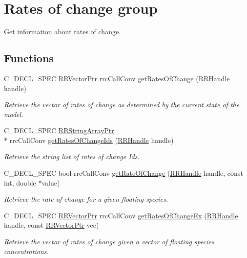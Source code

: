 \hypertarget{group__rate_of_change}{\section{Rates of change group}
\label{group__rate_of_change}
}


Get information about rates of change.  


\subsection*{Functions}
\begin{DoxyCompactItemize}
\item 
C\-\_\-\-D\-E\-C\-L\-\_\-\-S\-P\-E\-C \hyperlink{rrc__types_8h_a3be72d6006034fd349f753d2bf441bf7}{R\-R\-Vector\-Ptr} rrc\-Call\-Conv \hyperlink{group__rate_of_change_gad6f6fb8bf6b5e05b6337ec3c802709b3}{get\-Rates\-Of\-Change} (\hyperlink{rrc__types_8h_a1d68f0592372208fa5a5f2799ea4b3ae}{R\-R\-Handle} handle)
\begin{DoxyCompactList}\small\item\em Retrieve the vector of rates of change as determined by the current state of the model. \end{DoxyCompactList}\item 
C\-\_\-\-D\-E\-C\-L\-\_\-\-S\-P\-E\-C \hyperlink{rrc__types_8h_a7c9475df6c7337d99482b13a365e7596}{R\-R\-String\-Array\-Ptr} \\*
rrc\-Call\-Conv \hyperlink{group__rate_of_change_gaba7873ab3d30fc5b84bc3a901dcca811}{get\-Rates\-Of\-Change\-Ids} (\hyperlink{rrc__types_8h_a1d68f0592372208fa5a5f2799ea4b3ae}{R\-R\-Handle} handle)
\begin{DoxyCompactList}\small\item\em Retrieve the string list of rates of change Ids. \end{DoxyCompactList}\item 
C\-\_\-\-D\-E\-C\-L\-\_\-\-S\-P\-E\-C bool rrc\-Call\-Conv \hyperlink{group__rate_of_change_gacf4b39414587f2d4a51c8f90d7c4a571}{get\-Rate\-Of\-Change} (\hyperlink{rrc__types_8h_a1d68f0592372208fa5a5f2799ea4b3ae}{R\-R\-Handle} handle, const int, double $\ast$value)
\begin{DoxyCompactList}\small\item\em Retrieve the rate of change for a given floating species. \end{DoxyCompactList}\item 
C\-\_\-\-D\-E\-C\-L\-\_\-\-S\-P\-E\-C \hyperlink{rrc__types_8h_a3be72d6006034fd349f753d2bf441bf7}{R\-R\-Vector\-Ptr} rrc\-Call\-Conv \hyperlink{group__rate_of_change_ga353516c3b4889b3751e3422cad518c0e}{get\-Rates\-Of\-Change\-Ex} (\hyperlink{rrc__types_8h_a1d68f0592372208fa5a5f2799ea4b3ae}{R\-R\-Handle} handle, const \hyperlink{rrc__types_8h_a3be72d6006034fd349f753d2bf441bf7}{R\-R\-Vector\-Ptr} vec)
\begin{DoxyCompactList}\small\item\em Retrieve the vector of rates of change given a vector of floating species concentrations. \end{DoxyCompactList}\end{DoxyCompactItemize}



